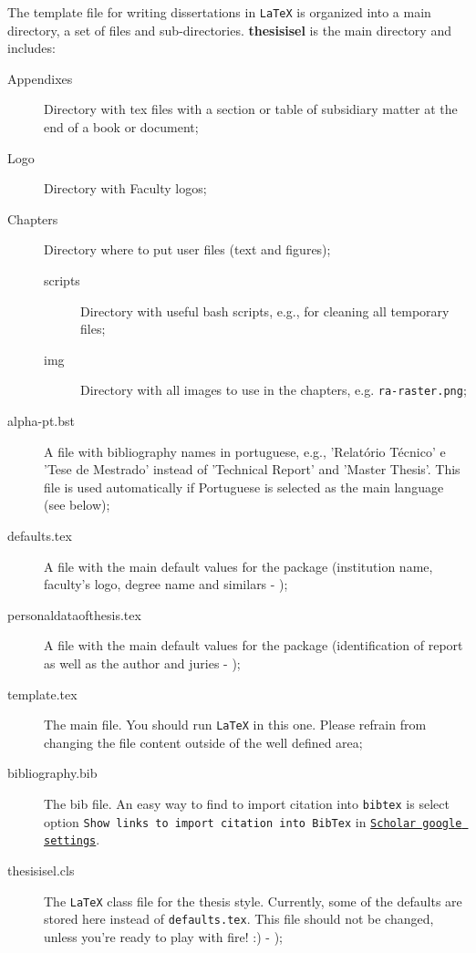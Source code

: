 The template file for writing dissertations in  \texttt{LaTeX} is organized into a main directory, a set of files and sub-directories. \textbf{thesisisel}  is the main directory and includes:
	\begin{description}
		\item[Appendixes] Directory with tex files with a section or table of subsidiary matter at the end of a book or document;
		\item[Logo] Directory with Faculty logos;
		\item[Chapters] Directory where to put user files (text and figures);
		\begin{description}
		\item[scripts] Directory with useful bash scripts, e.g., for cleaning all temporary files;
		\item[img] Directory with all images to use in the chapters, e.g. \texttt{ra-raster.png};
		\end{description}
		\item[alpha-pt.bst] A file with bibliography names in portuguese, e.g., 'Relatório Técnico' e 'Tese de Mestrado' instead of 'Technical Report' and 'Master Thesis'. This file is used automatically if Portuguese is selected as the main language (see below);
		\item[defaults.tex] A file with the main default values for the package (institution name, faculty's logo, degree name and similars - {\color{red}{TO CHANGE BY THE USER}});
		\item[personaldataofthesis.tex] A file with the main default values for the package (identification of report as well as the author and juries - {\color{red}{TO CHANGE BY THE USER}});
		\item[template.tex] The main file. You should run  \texttt{LaTeX} in this one. Please refrain from changing the file content outside of the well defined area;
		\item[bibliography.bib] The bib file. An easy way to find to import citation into \texttt{bibtex} is select option \texttt{Show links to import citation into \texttt{BibTex}} in \href{http://scholar.google.pt/scholar_settings?hl=en&as_sdt=0,5}{\texttt{Scholar google settings}}.
		\item[thesisisel.cls] The  \texttt{LaTeX} class file for the thesis{} style. Currently, some of the defaults are stored here instead of \verb!defaults.tex!. This file should not be changed, unless you're ready to play with fire! :) - {\color{red}{DO NOT CHANGE}});
	\end{description}

